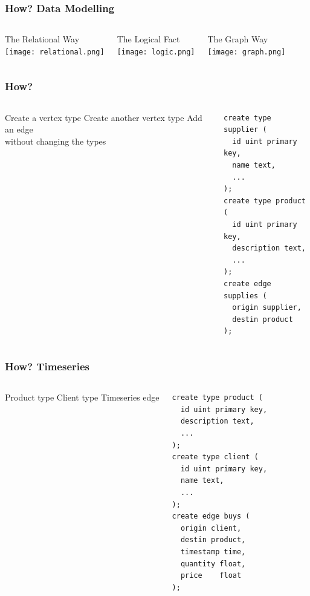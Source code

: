 \documentclass{beamer}
\begin{document}
\begin{frame}
\frametitle{How? Data Modelling}
\begin{columns}[T]
\begin{center}
\vskip0.5cm
The Relational Way\\
\vskip2.5cm
\texttt{[image: relational.png]}
\end{center}
\begin{center}
The Logical Fact\\[12pt]
\texttt{[image: logic.png]}
\end{center}
\begin{center}
\vskip0.5cm
The Graph Way\\
\vskip2.5cm
\linewidth
\texttt{[image: graph.png]}
\end{center}
\end{columns}
\end{frame}

\begin{frame}[fragile]
\frametitle{How? }
\begin{columns}[T]
\vskip0.5cm
{\small Create a vertex type}
\vskip1.7cm
{\small Create another vertex type}
\vskip1.2cm
{\small Add an edge \\without changing the types}
\begin{sqlcode}
\begin{lstlisting}
create type supplier (
  id uint primary key,
  name text,
  ...
);
create type product (
  id uint primary key,
  description text,
  ...
);
create edge supplies (
  origin supplier,
  destin product
);
\end{lstlisting}
\end{sqlcode}
\end{columns}
\end{frame}

\begin{frame}[fragile]
\frametitle{How? Timeseries}
\begin{columns}[T]
\vskip0.5cm
{\small Product type}
\vskip1.7cm
{\small Client type}
\vskip1.7cm
{\small Timeseries edge}
\begin{sqlcode}
\begin{lstlisting}
create type product (
  id uint primary key,
  description text,
  ...
);
create type client (
  id uint primary key,
  name text,
  ...
);
create edge buys (
  origin client,
  destin product,
  timestamp time,
  quantity float,
  price    float
);
\end{lstlisting}
\end{sqlcode}
\end{columns}
\end{frame}
\end{document}
